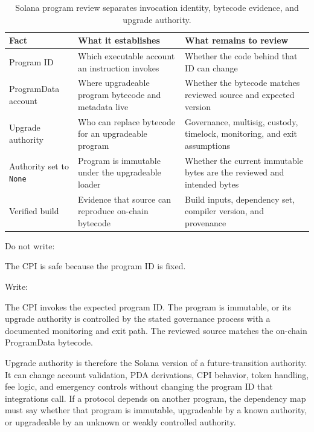 \begin{table}[htbp]
\centering
\small
\renewcommand{\arraystretch}{1.18}
\begin{tabularx}{\textwidth}{@{}>{\RaggedRight\arraybackslash}p{}>{\RaggedRight\arraybackslash}p{}X@{}}
\toprule
Fact & What it establishes & What remains to review \\
\midrule
Program ID & Which executable account an instruction invokes & Whether the code behind that ID can change \\
ProgramData account & Where upgradeable program bytecode and metadata live & Whether the bytecode matches reviewed source and expected version \\
Upgrade authority & Who can replace bytecode for an upgradeable program & Governance, multisig, custody, timelock, monitoring, and exit assumptions \\
Authority set to \texttt{None} & Program is immutable under the upgradeable loader & Whether the current immutable bytes are the reviewed and intended bytes \\
Verified build & Evidence that source can reproduce on-chain bytecode & Build inputs, dependency set, compiler version, and provenance \\
\bottomrule
\end{tabularx}
\caption{Solana program review separates invocation identity, bytecode evidence, and upgrade authority.}
\end{table}

Do not write:

\begin{codeblock}
The CPI is safe because the program ID is fixed.
\end{codeblock}

Write:

\begin{codeblock}
The CPI invokes the expected program ID.
The program is immutable, or its upgrade authority is controlled by
the stated governance process with a documented monitoring and exit path.
The reviewed source matches the on-chain ProgramData bytecode.
\end{codeblock}

Upgrade authority is therefore the Solana version of a future-transition authority. It can change account validation, PDA derivations, CPI behavior, token handling, fee logic, and emergency controls without changing the program ID that integrations call. If a protocol depends on another program, the dependency map must say whether that program is immutable, upgradeable by a known authority, or upgradeable by an unknown or weakly controlled authority.

